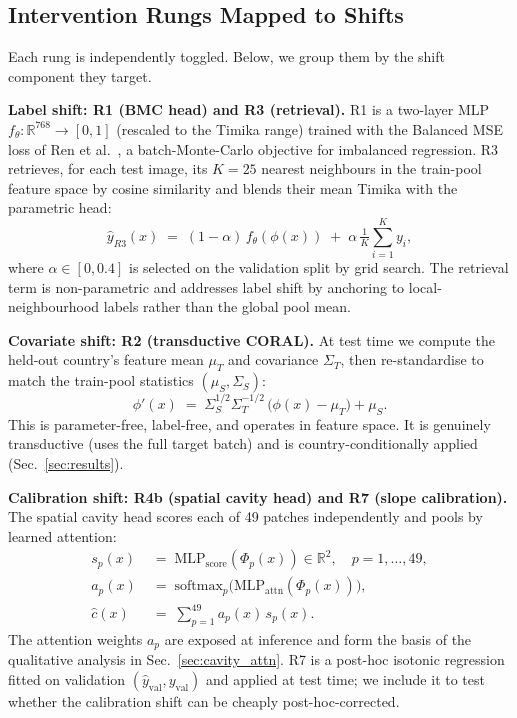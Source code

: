 \documentclass[runningheads]{llncs}
\begin{document}
\subsection{Intervention Rungs Mapped to Shifts}

Each rung is independently toggled. Below, we group them by the shift component they target.

\smallskip\noindent\textbf{Label shift: R1 (BMC head) and R3 (retrieval).}
R1 is a two-layer MLP $f_\theta : \mathbb{R}^{768} \to [0,1]$ (rescaled to the Timika range) trained with the Balanced MSE loss of Ren et al.~\cite{ren2022bmc}, a batch-Monte-Carlo objective for imbalanced regression. R3 retrieves, for each test image, its $K{=}25$ nearest neighbours in the train-pool feature space by cosine similarity and blends their mean Timika with the parametric head:
\begin{equation}
\hat{y}_{R3}(x) \;=\; (1-\alpha)\,f_\theta(\phi(x)) \;+\; \alpha\,\tfrac{1}{K}\!\sum_{i=1}^{K} y_i,
\label{eq:retrieval}
\end{equation}
where $\alpha\in[0,0.4]$ is selected on the validation split by grid search. The retrieval term is non-parametric and addresses label shift by anchoring to local-neighbourhood labels rather than the global pool mean.

\smallskip\noindent\textbf{Covariate shift: R2 (transductive CORAL).}
At test time we compute the held-out country's feature mean $\mu_T$ and covariance $\Sigma_T$, then re-standardise to match the train-pool statistics $(\mu_S, \Sigma_S)$:
\begin{equation}
\phi'(x) \;=\; \Sigma_S^{1/2}\Sigma_T^{-1/2}\,\bigl(\phi(x) - \mu_T\bigr) + \mu_S.
\label{eq:coral}
\end{equation}
This is parameter-free, label-free, and operates in feature space. It is genuinely transductive (uses the full target batch) and is country-conditionally applied (Sec.~\ref{sec:results}).

\smallskip\noindent\textbf{Calibration shift: R4b (spatial cavity head) and R7 (slope calibration).}
The spatial cavity head scores each of 49 patches independently and pools by learned attention:
\begin{align}
s_p(x) \;&=\; \mathrm{MLP}_{\text{score}}(\Phi_p(x)) \in \mathbb{R}^{2}, \quad p = 1,\dots,49, \\
a_p(x) \;&=\; \mathrm{softmax}_p\!\bigl(\mathrm{MLP}_{\text{attn}}(\Phi_p(x))\bigr), \\
\hat{c}(x) \;&=\; \sum_{p=1}^{49} a_p(x)\,s_p(x).
\label{eq:spatial_cav}
\end{align}
The attention weights $a_p$ are exposed at inference and form the basis of the qualitative analysis in Sec.~\ref{sec:cavity_attn}. R7 is a post-hoc isotonic regression~\cite{niculescu2005isotonic} fitted on validation $(\hat{y}_{\text{val}}, y_{\text{val}})$ and applied at test time; we include it to test whether the calibration shift can be cheaply post-hoc-corrected.
\end{document}
